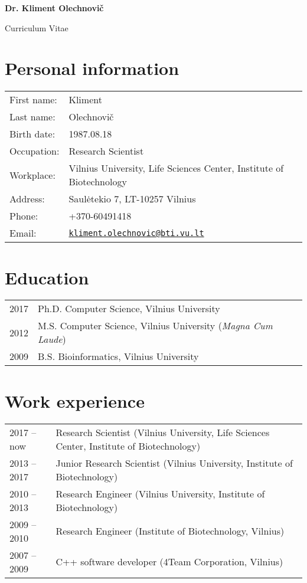 \documentclass{article}
\def\name{Dr. Kliment Olechnovi\v{c}}
\begin{document}
\begin{center}
{\huge \bf \name}
\end{center}

\begin{center}
{\Large Curriculum Vitae}
\end{center}


\section*{Personal information}
\begin{tabular}{p{}p{}}
First name:          & Kliment\\
Last name:           & Olechnovi\v{c}\\
Birth date:          & 1987.08.18 \\
Occupation:          & Research Scientist \\
Workplace:           & Vilnius University, Life Sciences Center, Institute of Biotechnology \\
Address:             & Saul\.{e}tekio 7, LT-10257 Vilnius \\
Phone:               & +370-60491418 \\
Email:               & \href{mailto:kliment.olechnovic@bti.vu.lt}{\tt kliment.olechnovic@bti.vu.lt} \\
\end{tabular}


\section*{Education}
\begin{tabular}{p{}p{}}
2017 & Ph.D. Computer Science, Vilnius University \\
2012 & M.S.  Computer Science, Vilnius University (\emph{Magna Cum Laude}) \\
2009 & B.S.  Bioinformatics, Vilnius University
\end{tabular}


\section*{Work experience}
\begin{tabular}{p{}p{}}
2017 -- now  & Research Scientist (Vilnius University, Life Sciences Center, Institute of Biotechnology)\\
2013 -- 2017 & Junior Research Scientist (Vilnius University, Institute of Biotechnology) \\
2010 -- 2013 & Research Engineer (Vilnius University, Institute of Biotechnology) \\
2009 -- 2010 & Research Engineer (Institute of Biotechnology, Vilnius) \\
2007 -- 2009 & C++ software developer (4Team Corporation, Vilnius)
\end{tabular}
\end{document}
